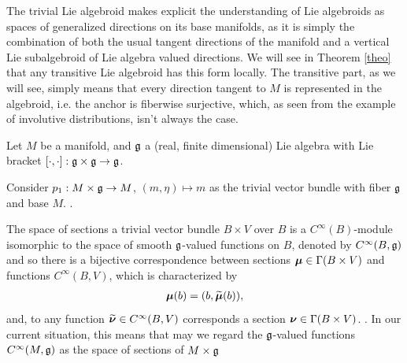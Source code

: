 The trivial Lie algebroid makes explicit the understanding of Lie algebroids as spaces of generalized directions on its base manifolds, as it is simply the combination of both the usual tangent directions of the manifold and a vertical Lie subalgebroid of Lie algebra valued directions. We will see in Theorem \ref{theo} that any transitive Lie algebroid has this form locally. The transitive part, as we will see, simply means that every direction tangent to $M$ is represented in the algebroid, i.e. the anchor is fiberwise surjective, which, as seen from the example of involutive distributions, isn't always the case.

Let $M$ be a manifold, and $\mathfrak{g}$ a (real, finite dimensional) Lie algebra with Lie bracket $[\cdot , \cdot]: \mathfrak{g} \times \mathfrak{g} \to \mathfrak{g}$.

Consider $p_1: M \times \mathfrak{g} \to M$, $(m, \eta) \mapsto m$ as the trivial vector bundle with fiber $\mathfrak{g}$ and base $M$. . %

The space of sections a trivial vector bundle $B \times V$ over $B$ is a $C^\infty(B)$-module isomorphic to the space of smooth $\mathfrak{g}$-valued functions on $B$, denoted by \emph{$C^\infty(B, \mathfrak{g})$} and so 
there is a bijective correspondence between sections $\bm{\mu} \in \Gamma(B \times V)$ and functions $C^\infty(B, V)$, which is characterized by
\begin{align} \label{defnTildeSect}
    \bm{\mu}(b) = (b, \widetilde{\bm{\mu}}(b)),
\end{align} and, to any function $\widetilde{\bm{\nu}} \in C^\infty(B, V)$ corresponds a section $\bm{\nu} \in \Gamma(B \times V)$. . In our current situation, this means that may we regard the $\mathfrak{g}$-valued functions $C^\infty(M, \mathfrak{g})$ as the space of sections of $M \times \mathfrak{g}$

